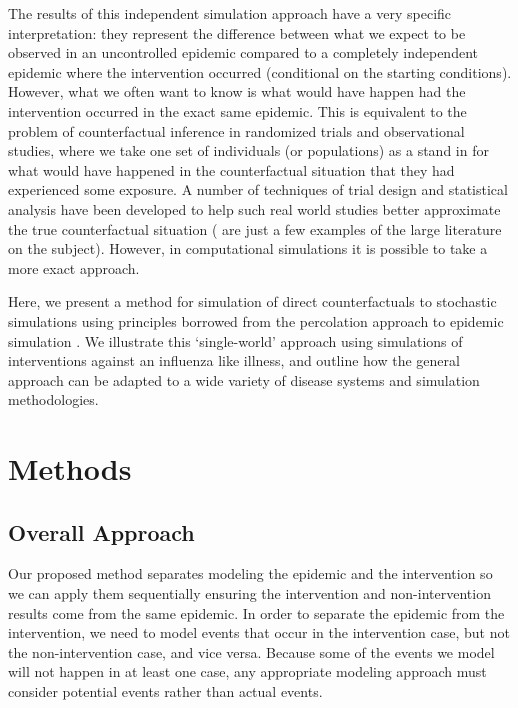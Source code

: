 \documentclass[PTRSB]{rsos}
\begin{document}
\begin{multicols}{2}
The results of this independent simulation approach have a very specific interpretation: they represent the difference between what we expect to be observed in an uncontrolled epidemic compared to a completely independent epidemic where the intervention occurred (conditional on the starting conditions).
However, what we often want to know is what would have happen had the intervention occurred in the exact same epidemic.
This is equivalent to the problem of counterfactual inference in randomized trials and observational studies, where we take one set of individuals (or populations) as a stand in for what would have happened in the counterfactual situation that they had experienced some exposure.
A number of techniques of trial design and statistical analysis have been developed to help such real world studies better approximate the true counterfactual situation (\cite{hudgens-halloran:2008,murray-et-al:2017,buchanan:2014} are just a few examples of the large literature on the subject). %
However, in computational simulations it is possible to take a more exact approach.

Here, we present a method for simulation of direct counterfactuals to stochastic simulations using principles borrowed from the percolation approach to epidemic simulation \cite{miller-book}.
We illustrate this ‘single-world’ approach using simulations of interventions against an influenza like illness, and outline how the general approach can be adapted to a wide variety of disease systems and simulation methodologies.

\section{Methods}
\subsection*{Overall Approach}
Our proposed method separates modeling the epidemic and the intervention so we can apply them sequentially ensuring the intervention and non-intervention results come from the same epidemic.
In order to separate the epidemic from the intervention, we need to model events that occur in the intervention case, but not the non-intervention case, and vice versa.
Because some of the events we model will not happen in at least one case, any appropriate modeling approach must consider potential events rather than actual events.


\end{multicols}
\end{document}
